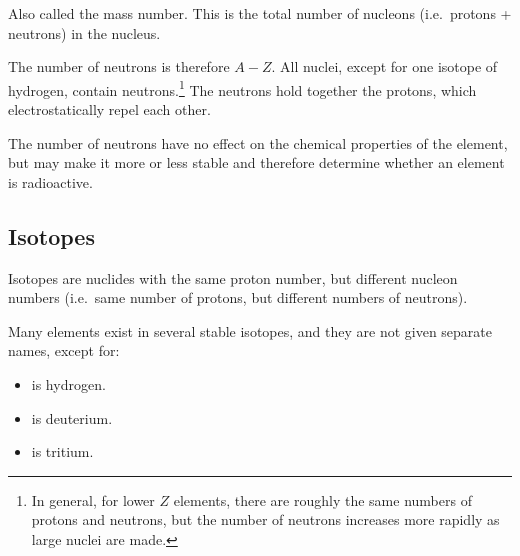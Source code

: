 Also called the mass number.  This is the total number of nucleons (i.e.\ protons + neutrons) in the nucleus.

The number of neutrons is therefore $A-Z$.  All nuclei, except for one isotope of hydrogen, contain neutrons.\footnote{In general, for lower $Z$ elements, there are roughly the same numbers of protons and neutrons, but the number of neutrons increases more rapidly as large nuclei are made.}  The neutrons hold together the protons, which electrostatically repel each other.

The number of neutrons have no effect on the chemical properties of the element, but may make it more or less stable and therefore determine whether an element is radioactive.

\subsection{Isotopes}

Isotopes are nuclides with the same proton number, but different nucleon numbers (i.e.\ same number of protons, but different numbers of neutrons).

Many elements exist in several stable isotopes, and they are not given separate names, except for:
\begin{itemize}
\item {} is hydrogen.
\item {} is deuterium.
\item {} is tritium.
\end{itemize}
